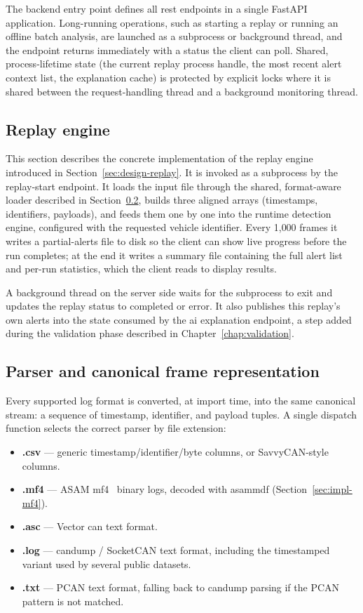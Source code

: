 The backend entry point defines all \gls{rest} endpoints in a single FastAPI~\cite{fastapi} application. Long-running operations, such as starting a replay or running an offline batch analysis, are launched as a subprocess or background thread, and the endpoint returns immediately with a status the client can poll. Shared, process-lifetime state (the current replay process handle, the most recent alert context list, the explanation cache) is protected by explicit locks where it is shared between the request-handling thread and a background monitoring thread.

\subsection{Replay engine}
\label{sec:impl-replay}

This section describes the concrete implementation of the replay engine introduced in Section~\ref{sec:design-replay}. It is invoked as a subprocess by the replay-start endpoint. It loads the input file through the shared, format-aware loader described in Section~\ref{sec:impl-parser}, builds three aligned arrays (timestamps, identifiers, payloads), and feeds them one by one into the runtime detection engine, configured with the requested vehicle identifier. Every 1{,}000 frames it writes a partial-alerts file to disk so the client can show live progress before the run completes; at the end it writes a summary file containing the full alert list and per-run statistics, which the client reads to display results.

A background thread on the server side waits for the subprocess to exit and updates the replay status to completed or error. It also publishes this replay's own alerts into the state consumed by the \gls{ai} explanation endpoint, a step added during the validation phase described in Chapter~\ref{chap:validation}.

\subsection{Parser and canonical frame representation}
\label{sec:impl-parser}

Every supported log format is converted, at import time, into the same canonical stream: a sequence of timestamp, identifier, and payload tuples. A single dispatch function selects the correct parser by file extension:

\begin{itemize}
    \item \textbf{.csv} --- generic timestamp/identifier/byte columns, or SavvyCAN-style columns.
    \item \textbf{.mf4} --- ASAM \gls{mf4}~\cite{asam_mdf} binary logs, decoded with asammdf (Section~\ref{sec:impl-mf4}).
    \item \textbf{.asc} --- Vector \gls{can} text format.
    \item \textbf{.log} --- candump / SocketCAN text format, including the timestamped variant used by several public datasets.
    \item \textbf{.txt} --- PCAN text format, falling back to candump parsing if the PCAN pattern is not matched.
\end{itemize}


